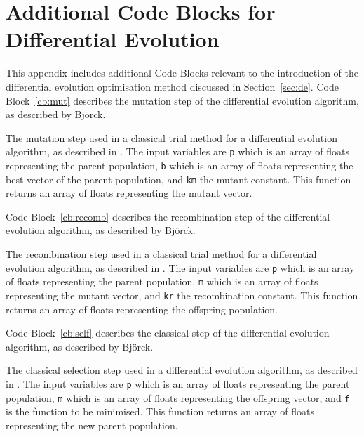 \chapter{Additional Code Blocks for Differential Evolution} %

\label{diff_evo_app} %

This appendix includes additional Code Blocks relevant to the introduction of the differential evolution optimisation method discussed in Section~\ref{sec:de}.
Code Block~\ref{cb:mut} describes the mutation step of the differential evolution algorithm, as described by Bj\"{o}rck.\autocite{bjorck_fitting_2011}
%
\begin{listing}
    \centering
    \caption{The mutation step used in a classical trial method for a differential evolution algorithm, as described in \cite{bjorck_fitting_2011}. The input variables are \texttt{p} which is an array of floats representing the parent population, \texttt{b} which is an array of floats representing the best vector of the parent population, and \texttt{km} the mutant constant. This function returns an array of floats representing the mutant vector.}
    
    \label{cb:mut}
\end{listing}
%
Code Block~\ref{cb:recomb} describes the recombination step of the differential evolution algorithm, as described by Bj\"{o}rck.\autocite{bjorck_fitting_2011}
%
\begin{listing}
    \centering
    \caption{The recombination step used in a classical trial method for a differential evolution algorithm, as described in \cite{bjorck_fitting_2011}. The input variables are \texttt{p} which is an array of floats representing the parent population, \texttt{m} which is an array of floats representing the mutant vector, and \texttt{kr} the recombination constant. This function returns an array of floats representing the offspring population.}
    
    \label{cb:recomb}
\end{listing}
%
Code Block~\ref{cb:self} describes the classical step of the differential evolution algorithm, as described by Bj\"{o}rck.\autocite{bjorck_fitting_2011}
%
\begin{listing}
    \centering
    \caption{The classical selection step used in a differential evolution algorithm, as described in \cite{bjorck_fitting_2011}. The input variables are \texttt{p} which is an array of floats representing the parent population, \texttt{m} which is an array of floats representing the offspring vector, and \texttt{f} is the function to be minimised. This function returns an array of floats representing the new parent population.}
    
    \label{cb:sel}
\end{listing}
%
